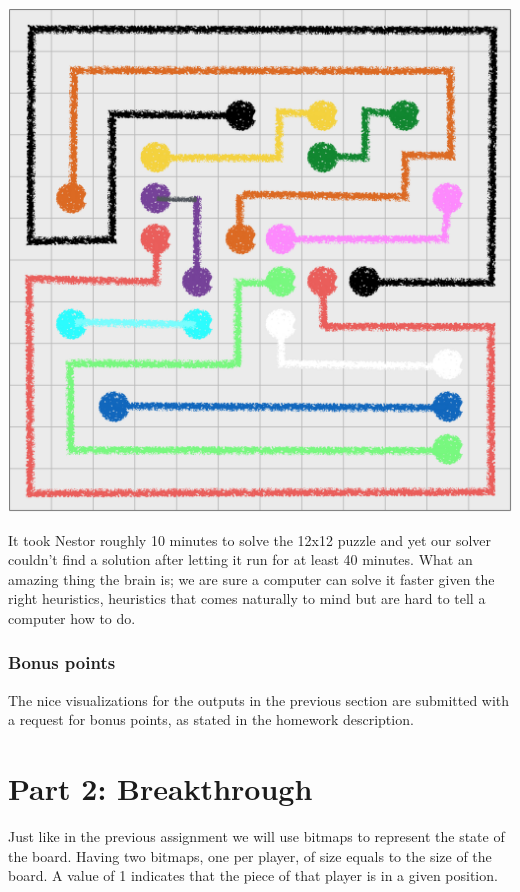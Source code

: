 \documentclass[11pt]{article}
\begin{document}
\begin{center}
\includegraphics[scale=0.6]{part1/12x12.png}
\end{center}

It took Nestor roughly 10 minutes to solve the 12x12 puzzle and yet our solver couldn't find a solution after letting it run for at least 40 minutes. What an amazing thing the brain is; we are sure a computer can solve it faster given the right heuristics, heuristics that comes naturally to mind but are hard to tell a computer how to do.

\subsubsection*{Bonus points}
The nice visualizations for the outputs in the previous section are submitted with a request for bonus points, as stated in the homework description.

\pagebreak


\pagebreak
\section*{Part 2: Breakthrough}
Just like in the previous assignment we will use bitmaps to represent the state of the board. Having two bitmaps, one per player, of size equals to the size of the board. A value of 1 indicates that the piece of that player is in a given position.\\
\end{document}
